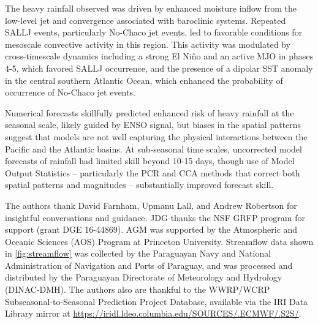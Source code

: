 \documentclass[twocol]{ametsoc}
\begin{document}
The heavy rainfall observed was driven by enhanced moisture inflow from the low-level jet and convergence associated with baroclinic systems.
Repeated SALLJ events, particularly No-Chaco jet events, led to favorable conditions for mesoscale convective activity in this region.
This activity was modulated by cross-timescale dynamics including a strong El Ni\~{n}o and an active MJO in phases 4-5, which favored SALLJ occurrence, and the presence of a dipolar SST anomaly in the central southern Atlantic Ocean, which enhanced the probability of occurrence of No-Chaco jet events.

Numerical forecasts skillfully predicted enhanced risk of heavy rainfall at the seasonal scale, likely guided by ENSO signal, but biases in the spatial patterns suggest that models are not well capturing the physical interactions between the Pacific and the Atlantic basins.
At sub-seasonal time scales, uncorrected model forecasts of rainfall had limited skill beyond 10-15 days, though use of Model Output Statistics -- particularly the PCR and CCA methods that correct both spatial patterns and magnitudes -- substantially improved forecast skill.


\acknowledgments
The authors thank David Farnham, Upmanu Lall, and Andrew Robertson for insightful conversations and guidance.
JDG thanks the NSF GRFP program for support (grant DGE 16-44869).
AGM was supported by the Atmospheric and Oceanic Sciences (AOS) Program at Princeton University.
Streamflow data shown in \cref{fig:streamflow} was collected by the Paraguayan Navy and National Administration of Navigation and Ports of Paraguay, and was processed and distributed by the Paraguayan Directorate of Meteorology and Hydrology (DINAC-DMH).
The authors also are thankful to the WWRP/WCRP Subseasonal-to-Seasonal Prediction Project Database, available via the IRI Data Library mirror at \url{https://iridl.ldeo.columbia.edu/SOURCES/.ECMWF/.S2S/}.




\end{document}
